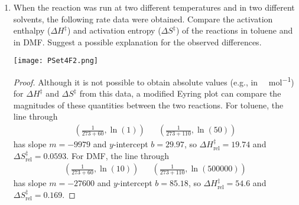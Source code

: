 \documentclass[../psets.tex]{subfiles}
\begin{document}
\begin{enumerate}
\begin{enumerate}
        \begin{proof}
            A large, likely primary KIE of 5 suggests that  bond cleavage is part of the RDS. Since the RDS of the concerted mechanism (the only step) involves  bond cleavage and the RDS of the stepwise mechanism (likely the first step, as is typical of E\textsubscript{1}-type mechanisms) does not involve  bond cleavage, the concerted mechanism is likely active in toluene.\par
            A small, likely secondary KIE of 1.2 suggests that  bond cleavage is \emph{not} part of the RDS. Thus, for analogous reasons to the above, the stepwise E\textsubscript{1}-type mechanism is likely active in DMF.
        \end{proof}
        \pagebreak
        \item When the reaction was run at two different temperatures and in two different solvents, the following rate data were obtained. Compare the activation enthalpy ($\Delta H^\ddagger$) and activation entropy ($\Delta S^\ddagger$) of the reactions in toluene and in DMF. Suggest a possible explanation for the observed differences.
        \begin{center}
            \texttt{[image: PSet4F2.png]}
        \end{center}
        \begin{proof}
            Although it is not possible to obtain absolute values (e.g., in \si{\kilo\calorie\per\mole}) for $\Delta H^\ddagger$ and $\Delta S^\ddagger$ from this data, a modified Eyring plot can compare the magnitudes of these quantities between the two reactions. For toluene, the line through
            \begin{align*}
                \left( \frac{1}{273+60},\ln(1) \right)&&
                \left( \frac{1}{273+110},\ln(50) \right)
            \end{align*}
            has slope $m=-9979$ and $y$-intercept $b=29.97$, so $\Delta H^\ddagger_\text{rel}=19.74$ and $\Delta S^\ddagger_\text{rel}=0.0593$. For DMF, the line through
            \begin{align*}
                \left( \frac{1}{273+60},\ln(10) \right)&&
                \left( \frac{1}{273+110},\ln(\num{500000}) \right)
            \end{align*}
            has slope $m=-27600$ and $y$-intercept $b=85.18$, so $\Delta H^\ddagger_\text{rel}=54.6$ and $\Delta S^\ddagger_\text{rel}=0.169$.\par

\end{proof}
\end{enumerate}
\end{enumerate}
\end{document}

